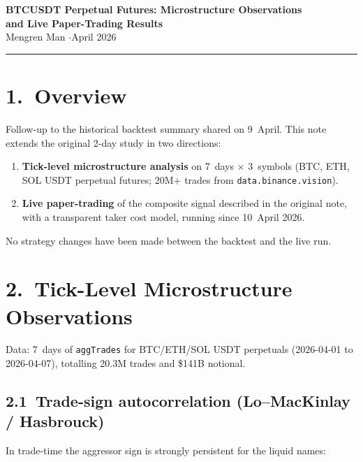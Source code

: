\documentclass[10pt,a4paper]{article}
\begin{document}
\begin{center}
  {\large\bfseries BTCUSDT Perpetual Futures: Microstructure Observations\\[2pt]
  and Live Paper-Trading Results}\\[4pt]
  {\footnotesize Mengren Man \quad$\cdot$\quad April 2026}
\end{center}

\vspace{6pt}\hrule\vspace{6pt}

\section*{1.\ Overview}

Follow-up to the historical backtest summary shared on 9~April. This note
extends the original 2-day study in two directions:

\begin{enumerate}[leftmargin=1.5em, itemsep=1pt, topsep=2pt]
  \item \textbf{Tick-level microstructure analysis} on 7~days $\times$ 3~symbols
        (BTC, ETH, SOL USDT perpetual futures; 20M+ trades from
        \texttt{data.binance.vision}).
  \item \textbf{Live paper-trading} of the composite signal described in the
        original note, with a transparent taker cost model, running since
        10~April 2026.
\end{enumerate}

\noindent
No strategy changes have been made between the backtest and the live run.

\section*{2.\ Tick-Level Microstructure Observations}

Data: 7~days of \texttt{aggTrades} for BTC/ETH/SOL USDT perpetuals
(2026-04-01 to 2026-04-07), totalling 20.3M trades and \$141B notional.

\subsection*{2.1\ Trade-sign autocorrelation (Lo--MacKinlay / Hasbrouck)}

In trade-time the aggressor sign is strongly persistent for the liquid names:
\end{document}
